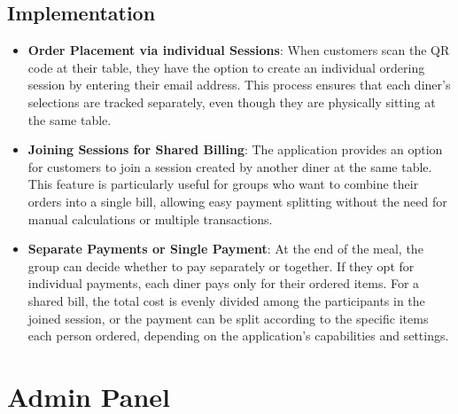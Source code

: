 \subsection{Implementation}
\begin{itemize}
    \item \textbf{Order Placement via individual Sessions}: When customers scan the QR code at their table, they have the option to create an individual ordering session by entering their email address. This process ensures that each diner's selections are tracked separately, even though they are physically sitting at the same table.
    \item \textbf{Joining Sessions for Shared Billing}: The application provides an option for customers to join a session created by another diner at the same table. This feature is particularly useful for groups who want to combine their orders into a single bill, allowing easy payment splitting without the need for manual calculations or multiple transactions.
    \item \textbf{Separate Payments or Single Payment}: At the end of the meal, the group can decide whether to pay separately or together. If they opt for individual payments, each diner pays only for their ordered items. For a shared bill, the total cost is evenly divided among the participants in the joined session, or the payment can be split according to the specific items each person ordered, depending on the application's capabilities and settings.
\end{itemize}

\section{Admin Panel}
